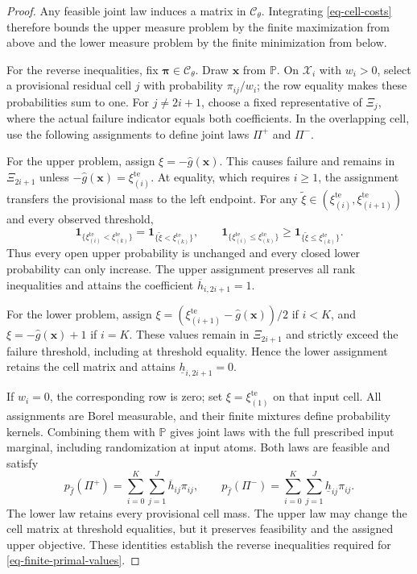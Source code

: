 \documentclass[review,11pt,3p,authoryear,nopreprintline]{elsarticle}
\begin{document}
\begin{proof}
  Any feasible joint law induces a matrix in $\mathcal C_\theta$. Integrating \eqref{eq-cell-costs} therefore bounds the upper measure problem by the finite maximization from above and the lower measure problem by the finite minimization from below.

  For the reverse inequalities, fix $\bm\pi\in\mathcal C_\theta$. Draw $\bm x$ from $\mathbb P$. On $\mathcal X_i$ with $w_i>0$, select a provisional residual cell $j$ with probability $\pi_{ij}/w_i$; the row equality makes these probabilities sum to one. For $j\ne2i+1$, choose a fixed representative of $\Xi_j$, where the actual failure indicator equals both coefficients. In the overlapping cell, use the following assignments to define joint laws $\Pi^+$ and $\Pi^-$.

  For the upper problem, assign $\xi=-\hat g(\bm x)$. This causes failure and remains in $\Xi_{2i+1}$ unless $-\hat g(\bm x)=\xi_{(i)}^{\mathrm{te}}$. At equality, which requires $i\ge1$, the assignment transfers the provisional mass to the left endpoint. For any $\widetilde\xi\in\left(\xi_{(i)}^{\mathrm{te}},\xi_{(i+1)}^{\mathrm{te}}\right)$ and every observed threshold,
  \[
    \mathbf1_{\{\xi_{(i)}^{\mathrm{te}}<\xi_{(k)}^{\mathrm{te}}\}}
      =\mathbf1_{\{\widetilde\xi<\xi_{(k)}^{\mathrm{te}}\}},
    \qquad
    \mathbf1_{\{\xi_{(i)}^{\mathrm{te}}\le\xi_{(k)}^{\mathrm{te}}\}}
      \ge\mathbf1_{\{\widetilde\xi\le\xi_{(k)}^{\mathrm{te}}\}}.
  \]
  Thus every open upper probability is unchanged and every closed lower probability can only increase. The upper assignment preserves all rank inequalities and attains the coefficient $\overline h_{i,2i+1}=1$.

  For the lower problem, assign $\xi=\left(\xi_{(i+1)}^{\mathrm{te}}-\hat g(\bm x)\right)/2$ if $i<K$, and $\xi=-\hat g(\bm x)+1$ if $i=K$. These values remain in $\Xi_{2i+1}$ and strictly exceed the failure threshold, including at threshold equality. Hence the lower assignment retains the cell matrix and attains $\underline h_{i,2i+1}=0$.

  If $w_i=0$, the corresponding row is zero; set $\xi=\xi_{(1)}^{\mathrm{te}}$ on that input cell. All assignments are Borel measurable, and their finite mixtures define probability kernels. Combining them with $\mathbb P$ gives joint laws with the full prescribed input marginal, including randomization at input atoms. Both laws are feasible and satisfy
  \[
    p_{\hat f}(\Pi^+)=\sum_{i=0}^{K}\sum_{j=1}^{J}\overline h_{ij}\pi_{ij},
    \qquad
    p_{\hat f}(\Pi^-)=\sum_{i=0}^{K}\sum_{j=1}^{J}\underline h_{ij}\pi_{ij}.
  \]
  The lower law retains every provisional cell mass. The upper law may change the cell matrix at threshold equalities, but it preserves feasibility and the assigned upper objective. These identities establish the reverse inequalities required for \eqref{eq-finite-primal-values}.


\end{proof}
\end{document}
